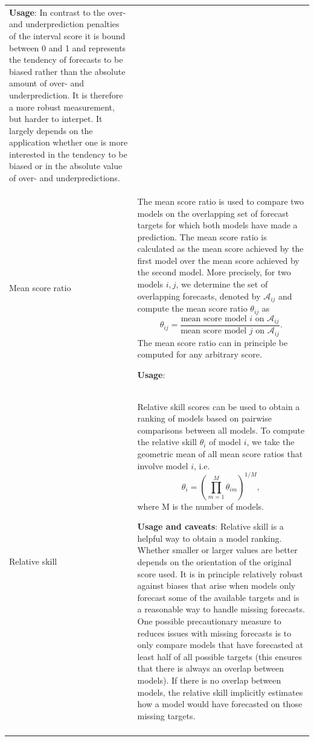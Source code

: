 \documentclass[
]{jss}
\begin{document}
\begin{CodeChunk}
\begin{longtable}[t]{>{\raggedright\arraybackslash}p{1.1in}>{\raggedright\arraybackslash}p{4.625in}}
  \textbf{Usage}:
  In contrast to the over- and underprediction penalties of the interval score it is bound between 0 and 1 and represents the tendency of forecasts to be biased rather than the absolute amount of over- and underprediction. It is therefore a more robust measurement, but harder to interpet. It largely depends on the application whether one is more interested in the tendency to be biased or in the absolute value of over- and underpredictions.\\
\addlinespace
Mean score ratio & The mean score ratio is used to compare two models on the overlapping set of forecast targets for which both models have made a prediction. The mean score ratio is calculated as the mean score achieved by the first model over the mean score achieved by the second model. More precisely, for two models $i, j$, we determine the set of overlapping forecasts, denoted by $\mathcal{A}_{ij}$ and compute the mean score ratio $\theta_{ij}$ as
  $$\theta_{ij} =\frac{\text{mean score model } i \text{ on } \mathcal{A}_{ij}}{\text{mean score model } j \text{ on } \mathcal{A}_{ij}}.$$
  The mean score ratio can in principle be computed for any arbitrary score.

  \textbf{Usage}:
\cellcolor{gray!6}{  Mean scores ratios are usually calculated in the context of pairwise comparisons, where a set of models is compared by looking at mean score ratios of all possible parings. Whether smaller or larger values are better depends on the orientation of the original score used}\\
\addlinespace
Relative skill & Relative skill scores can be used to obtain a ranking of models based on pairwise comparisons between all models. To compute the relative skill $\theta_i$ of model $i$, we take the geometric mean of all mean score ratios that involve model $i$, i.e.
  $$ \theta_{i} = \left(\prod_{m = 1}^M \theta_{im}\right)^{1/M}, $$
  where M is the number of models.

  \textbf{Usage and caveats}:
  Relative skill is a helpful way to obtain a model ranking. Whether smaller or larger values are better depends on the orientation of the original score used.
  It is in principle relatively robust against biases that arise when models only forecast some of the available targets and is a reasonable way to handle missing forecasts. One possible precautionary measure to reduces issues with missing forecasts is to only compare models that have forecasted at least half of all possible targets (this ensures that there is always an overlap between models). If there is no overlap between models, the relative skill implicitly estimates how a model would have forecasted on those missing targets.\\*
\label{tab:score-table-detailed}
\end{longtable}

\end{CodeChunk}

\newpage


\end{document}
